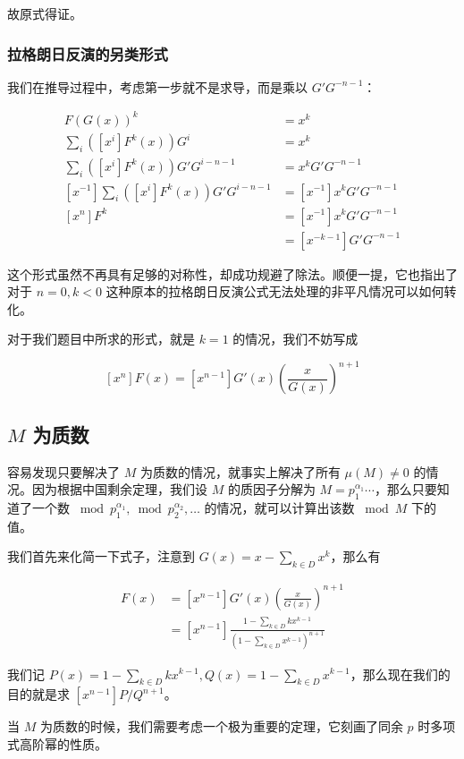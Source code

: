 \documentclass[12pt]{ctexart}
\begin{document}
故原式得证。

\subsubsection{拉格朗日反演的另类形式}

我们在推导过程中，考虑第一步就不是求导，而是乘以 $G'G^{-n-1}$：

\begin{align*}
F(G(x))^k &= x^k\\
\sum_i ([x^i]F^k(x))G^i &= x^k\\
\sum_i ([x^i]F^k(x))G'G^{i-n-1} &= x^k G'G^{-n-1}\\
[x^{-1}]\sum_i ([x^i]F^k(x))G'G^{i-n-1} &= [x^{-1}]x^k G'G^{-n-1}\\
[x^n]F^k &= [x^{-1}]x^k G'G^{-n-1}\\
&= [x^{-k-1}]G'G^{-n-1}
\end{align*}

这个形式虽然不再具有足够的对称性，却成功规避了除法。顺便一提，它也指出了对于 $n=0,k<0$ 这种原本的拉格朗日反演公式无法处理的非平凡情况可以如何转化。

对于我们题目中所求的形式，就是 $k=1$ 的情况，我们不妨写成

$$
[x^n]F(x) = [x^{n-1}]G'(x)\left(\frac {x}{G(x)}\right)^{n+1}
$$

\subsection{$M$ 为质数}

容易发现只要解决了 $M$ 为质数的情况，就事实上解决了所有 $\mu(M) \neq0 $ 的情况。因为根据中国剩余定理，我们设 $M$ 的质因子分解为 $M=p_1^{\alpha_1} \cdots$，那么只要知道了一个数 $\bmod p_1^{\alpha_1}, \bmod p_2^{\alpha_2},\dots$ 的情况，就可以计算出该数 $\bmod M$ 下的值。

我们首先来化简一下式子，注意到 $G(x)= x-\sum_{k\in D}x^k$，那么有

\begin{align*}
[x^n]F(x) &=[x^{n-1}] G'(x)\left(\frac {x}{G(x)}\right)^{n+1}\\
&= [x^{n-1}] \frac{1-\sum_{k\in D} kx^{k-1}}{(1-\sum_{k\in D} x^{k-1})^{n+1}}
\end{align*}

我们记 $P(x)=1-\sum_{k\in D} kx^{k-1}, Q(x)=1-\sum_{k\in D} x^{k-1}$，那么现在我们的目的就是求 $[x^{n-1}] P/Q^{n+1}$。

当 $M$ 为质数的时候，我们需要考虑一个极为重要的定理，它刻画了同余 $p$ 时多项式高阶幂的性质。
\end{document}
